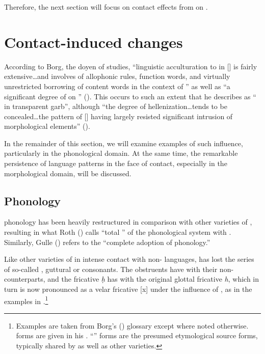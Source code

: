 \documentclass[output=paper]{langsci/langscibook}
\begin{document}
Therefore, the next section will focus on contact effects from  on .

\section{Contact-induced changes}
According to Borg, the doyen of  studies, “linguistic acculturation to  in [] is fairly extensive…and involves  of allophonic rules, function words, and virtually unrestricted borrowing of content words in the context of ” as well as “a significant degree of  on  ” (\citeyear[64]{Borg2004}). This occurs to such an extent that he describes  as “ in transparent  garb”, although “the degree of hellenization…tends to be concealed…the  pattern of [] having largely resisted significant intrusion of  morphological elements” (\citeyear[65]{Borg2004}).

In the remainder of this section, we will examine examples of such  influence, particularly in the phonological domain. At the same time, the remarkable persistence of  language patterns in the face of  contact, especially in the morphological domain, will be discussed.

\subsection{Phonology}


 phonology has been heavily restructured in comparison with other varieties of , resulting in what Roth (\citeyear[55]{Roth2004}) calls “total ” of the phonological system with  . Similarly, Gulle (\citeyear[47]{Gulle2016}) refers to the “complete adoption of  phonology.”

Like other varieties of  in intense contact with non- languages,  has lost the series of so-called , guttural or  consonants. The obstruents have  with their non- counterparts, and the  fricative \textit{ḥ} has  with the original glottal fricative \textit{h}, which in turn is now pronounced as a velar fricative [x] under the influence of , as in the examples in .\footnote{Examples are taken from Borg's (\citeyear{Borg2004}) glossary except where noted otherwise.  forms are given in his . “” forms are the presumed etymological source forms, typically shared by   as well as other varieties.}
\end{document}
